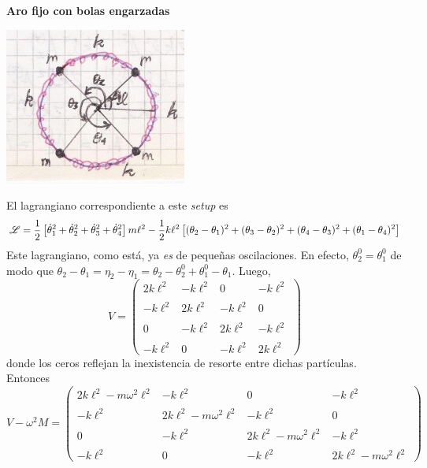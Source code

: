 \documentclass[10pt,oneside]{CBFT_book}
\begin{document}
\begin{ejemplo}{\bf Aro fijo con bolas engarzadas}
 
\includegraphics[scale=0.5]{images/fig_mc_problema_aro_modos_normales_1.jpg}  

El lagrangiano correspondiente a este {\it setup} es 
\[
	\mathscr{L} = \frac 1 2 \left[ \dot{\theta}^2_1 + \dot{\theta}^2_2 + \dot{\theta}^2_3 + \dot{\theta}^2_4 \right] m \ell^2 
	- \frac 1 2 k \ell^2 \left[ ( \theta_2 - \theta_1 )^2 + ( \theta_3 - \theta_2 )^2 + ( \theta_4 - \theta_3 )^2 +
	( \theta_1 - \theta_4 )^2 \right]
\]
Este lagrangiano, como está, ya {\it es} de pequeñas oscilaciones. En efecto, $\theta_2^0 = \theta_1^0 $ de modo que 
$\theta_2 - \theta_1 = \eta_2 - \eta_1 = \theta_2 - \theta_2^0 + \theta_1^0 - \theta_1$. 
Luego,
\[
	V = \begin{pmatrix}
		2k\ell^2 & - k\ell^2 & 0 & -k\ell^2 \\
		\\
		-k\ell^2 & 2 k\ell^2 & -k\ell^2 & 0 \\
		\\
		0 & - k\ell^2 & 2k\ell^2 & -k\ell^2 \\
		\\
		-k\ell^2 & 0 & -k\ell^2 & 2k\ell^2 
	    \end{pmatrix}
\]
donde los ceros reflejan la inexistencia de resorte entre dichas partículas. Entonces
\[
	V - \omega^2 M = \begin{pmatrix}
		2k\ell^2 - m \omega^2 \ell^2 & - k\ell^2 & 0 & -k\ell^2 \\
		\\
		-k\ell^2 & 2 k\ell^2 - m \omega^2 \ell^2 & -k\ell^2 & 0 \\
		\\
		0 & - k\ell^2 & 2k\ell^2 - m \omega^2 \ell^2& -k\ell^2 \\
		\\
		-k\ell^2 & 0 & -k\ell^2 & 2k\ell^2 - m \omega^2 \ell^2
	    \end{pmatrix}
\]
 

\end{ejemplo}
\end{document}
